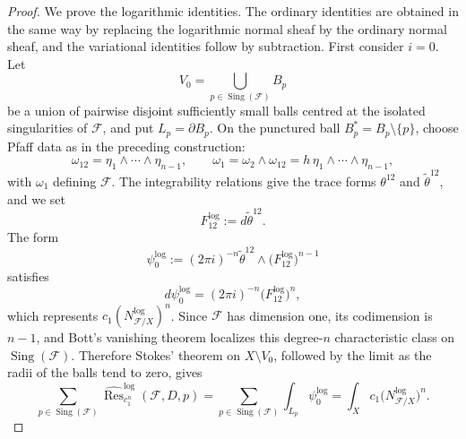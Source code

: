 \documentclass[12pt,reqno,a4paper]{amsart}
\numberwithin{equation}{section}
\theoremstyle{plain}
\theoremstyle{definition}
\DeclareMathOperator{\Sing}{Sing}
\newcommand{\cF}{\mathcal{F}}
\begin{document}
\begin{proof}
We prove the logarithmic identities. The ordinary identities are obtained in
the same way by replacing the logarithmic normal sheaf by the ordinary normal
sheaf, and the variational identities follow by subtraction.
First consider \(i=0\). Let
\[
V_0=\bigcup_{p\in \Sing(\cF)}B_p
\]
be a union of pairwise disjoint sufficiently small balls centred at the isolated
singularities of \(\cF\), and put \(L_p=\partial B_p\). On the punctured ball
\(B_p^\ast=B_p\setminus\{p\}\), choose Pfaff data as in the preceding
construction:
\[
\omega_{12}=\eta_1\wedge\cdots\wedge\eta_{n-1},
\qquad
\omega_1=\omega_2\wedge\omega_{12}
=
h\,\eta_1\wedge\cdots\wedge\eta_{n-1},
\]
with \(\omega_1\) defining \(\cF\). The integrability relations give the trace
forms \(\theta^{12}\) and \(\widetilde\theta^{12}\), and we set
\[
F_{12}^{\log}:=d\widetilde\theta^{12}.
\]
The form
\[
\psi_0^{\log}
:=
(2\pi i)^{-n}
\widetilde\theta^{12}\wedge
\bigl(F_{12}^{\log}\bigr)^{n-1}
\]
satisfies
\[
d\psi_0^{\log}
=
(2\pi i)^{-n}
\bigl(F_{12}^{\log}\bigr)^n,
\]
which represents \(c_1(N^{\log}_{\cF/X})^n\). Since \(\cF\) has dimension one,
its codimension is \(n-1\), and Bott's vanishing theorem localizes this
degree-\(n\) characteristic class on \(\Sing(\cF)\). Therefore Stokes' theorem
on \(X\setminus V_0\), followed by the limit as the radii of the balls tend to
zero, gives
\[
\sum_{p\in \Sing(\cF)}
\widehat{\operatorname{Res}}^{\log}_{c_1^n}(\cF,D,p)
=
\sum_{p\in \Sing(\cF)}
\int_{L_p}\psi_0^{\log}
=
\int_X c_1\bigl(N^{\log}_{\cF/X}\bigr)^n.
\]


\end{proof}
\end{document}
